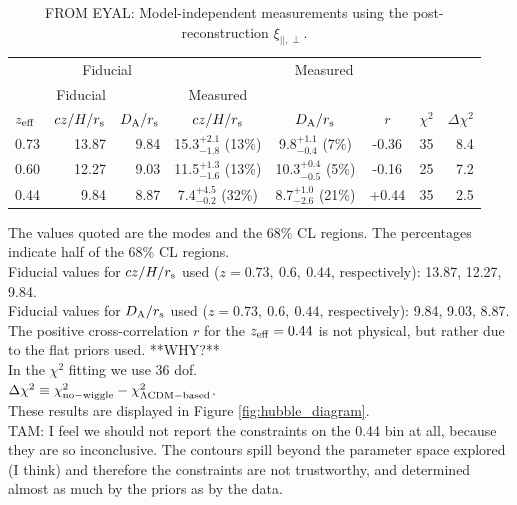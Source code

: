 \documentclass[iop,twocolappendix]{emulateapj}
\newcommand{\red}{\color{red}}
\begin{document}
\begin{table}
\begin{centering}
\caption{FROM EYAL: Model-independent measurements using the post-reconstruction $\xi_{||,\perp}$.}
\label{tab:hda_wigglez_reconstructed}
\begin{tabular}{ l | r | r | c | c | c | c | r }
\hline
              & \multicolumn{2}{c}{Fiducial} & \multicolumn{5}{c}{Measured} \\  
              & Fiducial & & Measured & & & & \\
$z_{\rm eff}$ & $cz/H/r_{\rm s}$ & $D_{\rm A}/r_{\rm s}$  & $cz/H/r_{\rm s}$ & $D_{\rm A}/r_{\rm s}$  & $r$ & $\chi^2$ & $\Delta\chi^2$ \\
\hline
  0.73  & 13.87 & 9.84 & 15.3$^{+2.1}_{-1.8}$ (13\%)  &  9.8$^{+1.1}_{-0.4}$ (7\%)   & -0.36  & 35 & 8.4 \\
  0.60  & 12.27 & 9.03 & 11.5$^{+1.3}_{-1.6}$ (13\%)  & 10.3$^{+0.4}_{-0.5}$ (5\%)   & -0.16  & 25 & 7.2 \\
  0.44  &  9.84 & 8.87 &  7.4$^{+4.5}_{-0.2}$ (32\%)  &  8.7$^{+1.0}_{-2.6}$ (21\%)  & +0.44  & 35 & 2.5 \\
\end{tabular}

\medskip
The values quoted are the modes and the $68\%$ CL regions. The percentages indicate half of the $68\%$ CL regions. \\
Fiducial values for $cz/H/r_{\rm s}$ used ($z=0.73,\ 0.6, \ 0.44$, respectively): 13.87, 12.27, 9.84. \\
Fiducial values for $D_{\rm A}/r_{\rm s}$ used ($z=0.73,\ 0.6, \ 0.44$, respectively): 9.84, 9.03, 8.87.\\
{\red The positive cross-correlation $r$ for the $z_{\rm eff}=0.44$ is not physical, but rather due to the flat priors used. **WHY?**} \\
In the $\chi^2$ fitting we use 36 dof. \\
$\Delta\chi^2\equiv \chi^2_{\rm no-wiggle} - \chi^2_{\rm \Lambda CDM-based}$. \\
These results are displayed in Figure \ref{fig:hubble_diagram}. \\
{\red TAM: I feel we should not report the constraints on the 0.44 bin at all, because they are so inconclusive.  The contours spill beyond the parameter space explored (I think) and therefore the constraints are not trustworthy, and determined almost as much by the priors as by the data. }
\end{centering}
\end{table}
\end{document}
